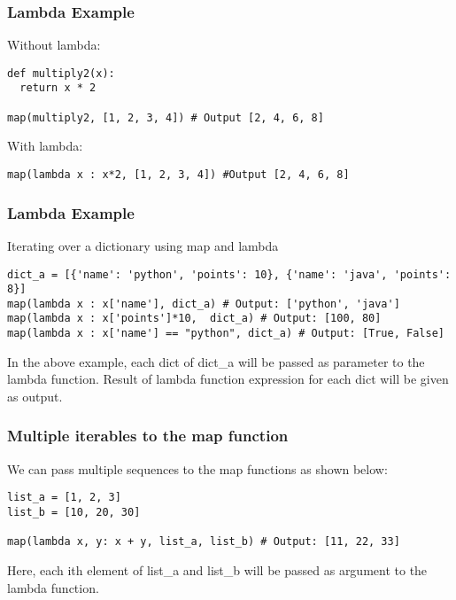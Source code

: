 \begin{frame}[fragile]\frametitle{Lambda Example}
Without lambda:
	    \begin{lstlisting}
def multiply2(x):
  return x * 2
    
map(multiply2, [1, 2, 3, 4]) # Output [2, 4, 6, 8]
\end{lstlisting}
With lambda:
	    \begin{lstlisting}
map(lambda x : x*2, [1, 2, 3, 4]) #Output [2, 4, 6, 8]
\end{lstlisting}
\end{frame}

\begin{frame}[fragile]\frametitle{Lambda Example}
Iterating over a dictionary using map and lambda
	    \begin{lstlisting}
dict_a = [{'name': 'python', 'points': 10}, {'name': 'java', 'points': 8}]
map(lambda x : x['name'], dict_a) # Output: ['python', 'java']
map(lambda x : x['points']*10,  dict_a) # Output: [100, 80]
map(lambda x : x['name'] == "python", dict_a) # Output: [True, False]
\end{lstlisting}
In the above example, each dict of dict\_a will be passed as parameter to the lambda function. Result of lambda function expression for each dict will be given as output.
\end{frame}

\begin{frame}[fragile]\frametitle{Multiple iterables to the map function}
We can pass multiple sequences to the map functions as shown below:
	    \begin{lstlisting}
list_a = [1, 2, 3]
list_b = [10, 20, 30]
  
map(lambda x, y: x + y, list_a, list_b) # Output: [11, 22, 33]
\end{lstlisting}
Here, each ith element of list\_a and list\_b will be passed as argument to the lambda function.
\end{frame}

